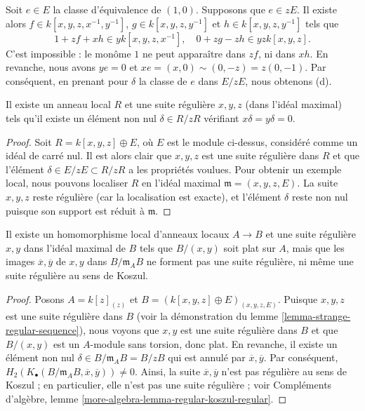 \medskip\noindent
Soit $e \in E$ la classe d'équivalence de $(1, 0)$.
Supposons que $e \in zE$. Il existe alors $f \in k[x, y, z, x^{-1}, y^{-1}]$,
$g \in k[x, y, z, y^{-1}]$ et $h \in k[x, y, z, y^{-1}]$ tels que
$$
1 + zf + xh \in yk[x, y, z, x^{-1}], \quad
0 + zg - zh \in yzk[x, y, z].
$$
C'est impossible : le monôme $1$ ne peut apparaître dans
$zf$, ni dans $xh$. En revanche, nous avons $ye = 0$ et
$xe = (x, 0) \sim (0, -z) = z(0, -1)$. Par conséquent, en prenant pour $\delta$
la classe de $e$ dans $E/zE$, nous obtenons (d).

\begin{lemma}
\label{lemma-strange-regular-sequence}
Il existe un anneau local $R$ et une suite régulière $x, y, z$
(dans l'idéal maximal) tels qu'il existe un élément non nul
$\delta \in R/zR$ vérifiant $x\delta = y\delta = 0$.
\end{lemma}

\begin{proof}
Soit $R = k[x, y, z] \oplus E$, où $E$ est le module ci-dessus, considéré
comme un idéal de carré nul. Il est alors clair que $x, y, z$ est une suite régulière
dans $R$ et que l'élément $\delta \in E/zE \subset R/zR$
a les propriétés voulues. Pour obtenir un exemple local,
nous pouvons localiser $R$ en l'idéal maximal $\mathfrak m = (x, y, z, E)$.
La suite $x, y, z$ reste régulière (car la localisation est
exacte), et l'élément $\delta$ reste non nul puisque son support est réduit
à $\mathfrak m$.
\end{proof}

\begin{lemma}
\label{lemma-base-change-regular-sequence}
Il existe un homomorphisme local d'anneaux locaux $A \to B$
et une suite régulière $x, y$ dans l'idéal maximal de $B$ tels que
$B/(x, y)$ soit plat sur $A$, mais que les images
$\overline{x}, \overline{y}$ de $x, y$ dans $B/\mathfrak m_AB$ ne
forment pas une suite régulière, ni même une suite régulière au sens de Koszul.
\end{lemma}

\begin{proof}
Posons $A = k[z]_{(z)}$ et $B = (k[x, y, z] \oplus E)_{(x, y, z, E)}$.
Puisque $x, y, z$ est une suite régulière dans $B$ (voir la démonstration du
lemme \ref{lemma-strange-regular-sequence}),
nous voyons que $x, y$ est une suite régulière dans $B$ et que
$B/(x, y)$ est un $A$-module sans torsion, donc plat.
En revanche, il existe un élément non nul
$\delta \in B/\mathfrak m_AB = B/zB$ qui est annulé
par $\overline{x}, \overline{y}$. Par conséquent,
$H_2(K_\bullet(B/\mathfrak m_AB, \overline{x}, \overline{y})) \not = 0$.
Ainsi, la suite $\overline{x}, \overline{y}$ n'est pas régulière au sens de Koszul ; en particulier,
elle n'est pas une suite régulière ; voir
Compléments d'algèbre, lemme \ref{more-algebra-lemma-regular-koszul-regular}.
\end{proof}





